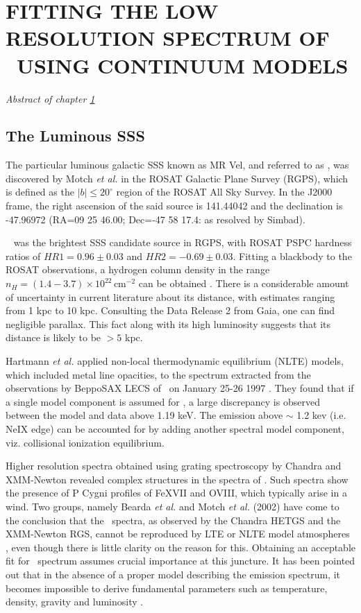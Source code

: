 \chapter{FITTING THE LOW RESOLUTION SPECTRUM OF \mrvel\ USING CONTINUUM MODELS} \label{chap:continuum}
    \minitoc
    \emph{Abstract of chapter \ref{chap:continuum}}
    
    \section{The Luminous SSS \mrvel} \label{continuum:on-mrvel}
		The particular luminous galactic SSS known as MR Vel, and referred to as \mrvel, was discovered by Motch \emph{et al.} \cite{motch1994} in the ROSAT Galactic Plane Survey (RGPS), which is defined as the $|b|\le 20^{\circ}$ region of the ROSAT All Sky Survey. In the J2000 frame, the right ascension of the said source is 141.44042 and the declination is -47.96972 (RA=09 25 46.00; Dec=-47 58 17.4: as resolved by Simbad).
		
		\mrvel~ was the brightest SSS candidate source in RGPS, with ROSAT PSPC hardness ratios of $HR1=0.96\pm 0.03$ and $HR2=-0.69\pm 0.03$. Fitting a blackbody to the ROSAT observations, a hydrogen column density in the range $n_H=(1.4-3.7)\times 10^{22}\,\mathrm{cm}^{-2}$ can be obtained \cite{motch1994}. There is a considerable amount of uncertainty in current literature about its distance, with estimates ranging from  1 kpc to 10 kpc. Consulting the Data Release 2 from Gaia, one can find negligible parallax. This fact along with its high luminosity suggests that its distance is likely to be $>5$ kpc.
		
		Hartmann \emph{et al.} applied non-local thermodynamic equilibrium (NLTE) models, which included metal line opacities, to the spectrum extracted from the observations by BeppoSAX LECS of \mrvel~on January 25-26 1997 \cite{hartmann99}. They found that if a single model component is assumed for \mrvel, a large discrepancy is observed between the model and data above 1.19 keV. The emission above $\sim$ 1.2 kev (i.e. NeIX edge) can be accounted for by adding another spectral model component, viz. collisional ionization equilibrium.
		
		Higher resolution spectra obtained using grating spectroscopy by Chandra and XMM-Newton revealed complex structures in the spectra of \mrvel. Such spectra show the presence of P Cygni profiles of FeXVII and OVIII, which typically arise in a wind. Two groups, namely Bearda \emph{et al.} and Motch \emph{et al.} (2002) have come to the conclusion that the \mrvel~spectra, as observed by the Chandra HETGS and the XMM-Newton RGS, cannot be reproduced by LTE or NLTE model atmospheres \cite{bearda2002,motch2002}, even though there is little clarity on the reason for this. Obtaining an acceptable fit for \mrvel~spectrum assumes crucial importance at this juncture. It has been pointed out that in the absence of a proper model describing the emission spectrum, it becomes impossible to derive fundamental parameters such as temperature, density, gravity and luminosity \cite{motch2002}.
		
